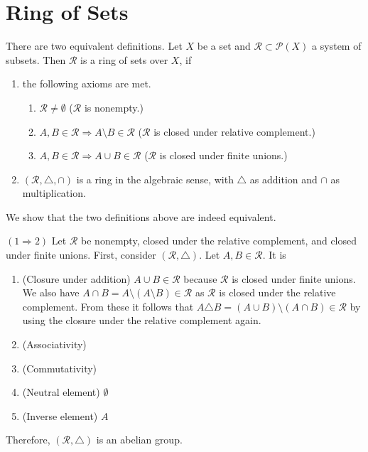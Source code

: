 \section{Ring of Sets}
\begin{definition}
    There are two equivalent definitions. Let {\color{mathif}\(X\)} be a {\color{mathif}set} and {\color{mathif}\(\mathcal{R} \subset \mathcal{P}(X)\)} a {\color{mathif}system of subsets}. Then {\color{maththen} \(\mathcal{R}\)}  is a {\color{maththen}ring of sets over \(X\)}, if
    \begin{enumerate}
        \item the following axioms are met.
        \begin{enumerate}
            \item \(\mathcal{R} \neq \emptyset\) (\(\mathcal{R}\) is {\color{mathrem}nonempty.})
            \item \(A, B \in \mathcal{R} \Rightarrow A \setminus B \in \mathcal{R}\) (\(\mathcal{R}\) is {\color{mathrem}closed under relative complement}.)
            \item \(A, B \in \mathcal{R} \Rightarrow A \cup B \in \mathcal{R}\) (\(\mathcal{R}\) is {\color{mathrem}closed under finite unions}.)
        \end{enumerate}
        \item \((\mathcal{R}, \triangle, \cap)\) is a ring in the algebraic sense, with \(\triangle\) as addition and \(\cap\) as multiplication.
    \end{enumerate}
\end{definition}
\begin{Proof}
    We show that the two definitions above are indeed equivalent.

    \((1 \Rightarrow 2)\) Let \(\mathcal{R}\) be nonempty, closed under the relative complement, and closed under finite unions. First, consider \((\mathcal{R}, \triangle)\). Let \(A, B \in \mathcal{R}\). It is
    \begin{enumerate}
        \item (Closure under addition) \(A \cup B \in \mathcal{R}\) because \(\mathcal{R}\) is closed under finite unions. We also have \(A \cap B = A \setminus (A \setminus B) \in \mathcal{R}\) as \(\mathcal{R}\) is closed under the relative complement. From these it follows that \( A \triangle B = (A \cup B) \setminus (A \cap B) \in \mathcal{R}\) by using the closure under the relative complement again.
        \item (Associativity)
        \item (Commutativity)
        \item (Neutral element) \(\emptyset\)
        \item (Inverse element) \(A\)
    \end{enumerate}
    Therefore, \((\mathcal{R}, \triangle)\) is an abelian group.
\end{Proof}

